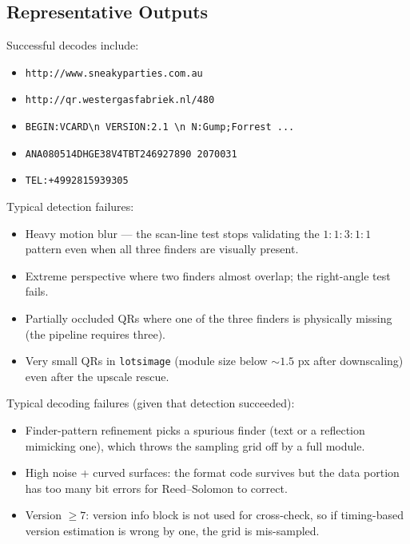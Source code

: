 \documentclass[11pt,a4paper]{article}
\begin{document}
\subsection{Representative Outputs}

Successful decodes include:
\begin{itemize}[leftmargin=1.4em, itemsep=0.1em]
  \item \texttt{http://www.sneakyparties.com.au}
  \item \texttt{http://qr.westergasfabriek.nl/480}
  \item \texttt{BEGIN:VCARD\textbackslash n VERSION:2.1 \textbackslash n
        N:Gump;Forrest ...}
  \item \texttt{ANA080514DHGE38V4TBT246927890 2070031}
  \item \texttt{TEL:+4992815939305}
\end{itemize}

Typical detection failures:
\begin{itemize}[leftmargin=1.4em, itemsep=0.1em]
  \item Heavy motion blur --- the scan-line test stops validating the
        $1{:}1{:}3{:}1{:}1$ pattern even when all three finders are
        visually present.
  \item Extreme perspective where two finders almost overlap; the
        right-angle test fails.
  \item Partially occluded QRs where one of the three finders is
        physically missing (the pipeline requires three).
  \item Very small QRs in \texttt{lotsimage} (module size below
        $\sim 1.5$ px after downscaling) even after the upscale rescue.
\end{itemize}

Typical decoding failures (given that detection succeeded):
\begin{itemize}[leftmargin=1.4em, itemsep=0.1em]
  \item Finder-pattern refinement picks a spurious finder (text or a
        reflection mimicking one), which throws the sampling grid off by
        a full module.
  \item High noise + curved surfaces: the format code survives but the
        data portion has too many bit errors for Reed--Solomon to
        correct.
  \item Version $\ge 7$: version info block is not used for cross-check,
        so if timing-based version estimation is wrong by one, the
        grid is mis-sampled.
\end{itemize}
\end{document}
